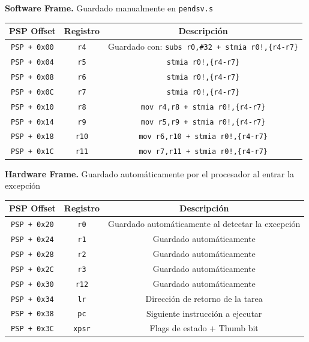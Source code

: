 \documentclass[12pt,letterpaper]{article}
\begin{document}
\textbf{Software Frame.} Guardado manualmente en \texttt{pendsv.s}
\begin{table}[h]
\centering
\begin{tabular}{|c|c|c|}
\hline
\textbf{PSP Offset} & \textbf{Registro} & \textbf{Descripción} \\ \hline
\texttt{PSP + 0x00} & \texttt{r4}  & Guardado con: \texttt{subs r0,\#32 + stmia r0!,\{r4-r7\}} \\ \hline
\texttt{PSP + 0x04} & \texttt{r5}  & \texttt{stmia r0!,\{r4-r7\}} \\ \hline
\texttt{PSP + 0x08} & \texttt{r6}  & \texttt{stmia r0!,\{r4-r7\}} \\ \hline
\texttt{PSP + 0x0C} & \texttt{r7}  & \texttt{stmia r0!,\{r4-r7\}} \\ \hline
\texttt{PSP + 0x10} & \texttt{r8}  & \texttt{mov r4,r8 + stmia r0!,\{r4-r7\}} \\ \hline
\texttt{PSP + 0x14} & \texttt{r9}  & \texttt{mov r5,r9 + stmia r0!,\{r4-r7\}} \\ \hline
\texttt{PSP + 0x18} & \texttt{r10} & \texttt{mov r6,r10 + stmia r0!,\{r4-r7\}} \\ \hline
\texttt{PSP + 0x1C} & \texttt{r11} & \texttt{mov r7,r11 + stmia r0!,\{r4-r7\}} \\ \hline
\end{tabular}
\end{table}

\newpage

\textbf{Hardware Frame.} Guardado automáticamente por el procesador al entrar la excepción
\begin{table}[h]
\centering
\begin{tabular}{|c|c|c|}
\hline
\textbf{PSP Offset} & \textbf{Registro} & \textbf{Descripción} \\ \hline
\texttt{PSP + 0x20} & \texttt{r0}  & Guardado automáticamente al detectar la excepción \\ \hline
\texttt{PSP + 0x24} & \texttt{r1}  & Guardado automáticamente \\ \hline
\texttt{PSP + 0x28} & \texttt{r2}  & Guardado automáticamente \\ \hline
\texttt{PSP + 0x2C} & \texttt{r3}  & Guardado automáticamente \\ \hline
\texttt{PSP + 0x30} & \texttt{r12} & Guardado automáticamente \\ \hline
\texttt{PSP + 0x34} & \texttt{lr}  & Dirección de retorno de la tarea \\ \hline
\texttt{PSP + 0x38} & \texttt{pc}  & Siguiente instrucción a ejecutar \\ \hline
\texttt{PSP + 0x3C} & \texttt{xpsr} & Flags de estado + Thumb bit \\ \hline
\end{tabular}
\end{table}
\end{document}
